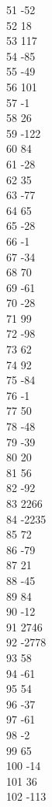 { 51	-52 \\
 52	18 \\
 53	117 \\
 54	-85 \\
 55	-49 \\
 56	101 \\
 57	-1 \\
 58	26 \\
 59	-122 \\
 60	84 \\
 61	-28 \\
 62	35 \\
 63	-77 \\
 64	65 \\
 65	-28 \\
 66	-1 \\
 67	-34 \\
 68	70 \\
 69	-61 \\
 70	-28 \\
 71	99 \\
 72	-98 \\
 73	62 \\
 74	92 \\
 75	-84 \\
 76	-1 \\
 77	50 \\
 78	-48 \\
 79	-39 \\
 80	20 \\
 81	56 \\
 82	-92 \\
 83	2266 \\
 84	-2235 \\
 85	72 \\
 86	-79 \\
 87	21 \\
 88	-45 \\
 89	84 \\
 90	-12 \\
 91	2746 \\
 92	-2778 \\
 93	58 \\
 94	-61 \\
 95	54 \\
 96	-37 \\
 97	-61 \\
 98	-2 \\
 99	65 \\
 100	-14 \\
 101	36 \\
 102	-113 \\
}
